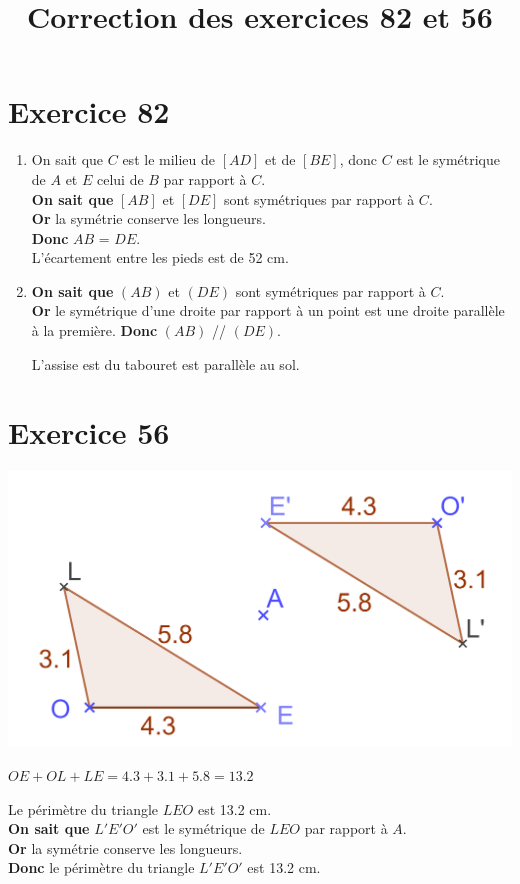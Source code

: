 \documentclass[12pt,a4paper]{article}
\title{Correction des exercices 82 et 56}
\date{}
\begin{document}
	
	\maketitle
	
	\section*{Exercice 82}
	\begin{enumerate}[label=\arabic*)]
		\item On sait que $C$ est le milieu de $[AD]$ et de $[BE]$, donc $C$ est le symétrique de $A$ et $E$ celui de $B$ par rapport à $C$.\\
		
		\textbf{On sait que} $[AB]$ et $[DE]$ sont symétriques par rapport à $C$.\\
		\textbf{Or} la symétrie conserve les longueurs.\\
		\textbf{Donc} $AB$ = $DE$.\\
		
		L'écartement entre les pieds est de 52 cm.
		
		\item 
		\textbf{On sait que} $(AB)$ et $(DE)$ sont symétriques par rapport à $C$.\\
		\textbf{Or} le symétrique d'une droite par rapport à un point est une droite parallèle à la première.
		\textbf{Donc} $(AB)$ // $(DE)$.
		
		L'assise est du tabouret est parallèle au sol.
	\end{enumerate}

	\section*{Exercice 56}
	
	\begin{center}
		\includegraphics[scale=0.2]{ex56}
	\end{center}

	\noindent $OE + OL + LE = \num{4.3} + \num{3.1} + \num{5.8} = \num{13.2}$
	
	\noindent Le périmètre du triangle $LEO$ est \num{13.2} cm.\\
	
	\noindent \textbf{On sait que} $L'E'O'$ est le symétrique de $LEO$ par rapport à $A$.\\
	\textbf{Or} la symétrie conserve les longueurs.\\
	\textbf{Donc} le périmètre du triangle $L'E'O'$ est \num{13.2} cm.
\end{document}
